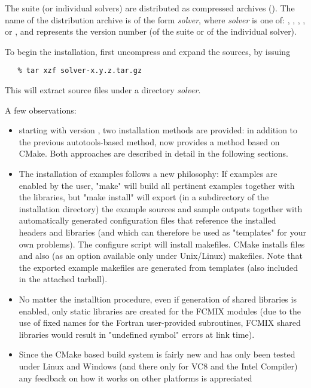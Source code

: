 The {\sundials} suite (or individual solvers) are distributed as compressed archives
(). The name of the distribution archive is of the form {\em solver},
where {\em solver} is one of: , , , , or ,
and  represents the version number (of the {\sundials} suite or of the individual solver).

To begin the installation, first uncompress and expand the sources, by issuing
\begin{verbatim}
   % tar xzf solver-x.y.z.tar.gz
\end{verbatim}
This will extract source files under a directory {\em solver}.


\vspace{0.25in}

\noindent A few observations:

\begin{itemize}

\item starting with version , two installation methods are provided: in addition to the previous autotools-based
method, {\sundials} now provides a method based on CMake. Both approaches are described in detail in the following sections.

\item The installation of examples follows a new philosophy:
If examples are enabled by the user, "make" will build all pertinent examples together with the {\sundials} libraries, but "make install"
will export (in a subdirectory of the installation directory) the example sources and sample outputs together with automatically generated
configuration files that reference the installed {\sundials} headers and libraries (and which can therefore be used as "templates" for your
own problems). The configure script will install makefiles. CMake installs  files and also (as an option available only under Unix/Linux)
makefiles. Note that the exported example makefiles are generated from templates (also included in the attached tarball).

\item No matter the installtion procedure, even if generation of shared libraries is enabled, only static libraries are created for the FCMIX modules
(due to the use of fixed names for the Fortran user-provided subroutines, FCMIX shared libraries would result in "undefined symbol"
errors at link time).

\item Since the CMake based build system is fairly new and has only been tested under Linux and Windows (and there only for VC8 and the Intel Compiler)
any feedback on how it works on other platforms is appreciated

\end{itemize}


